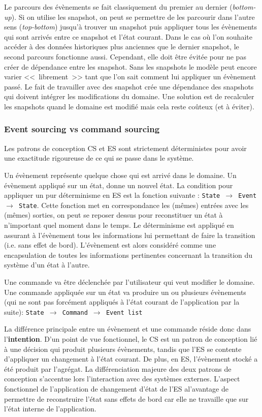 Le parcours des évènements se fait classiquement du premier au dernier 
(\textit{bottom-up}). Si on utilise les \gls{snapshot}, on peut se permettre de les 
parcourir dans l'autre sens (\textit{top-bottom}) jusqu'à trouver un \gls{snapshot} 
puis appliquer tous les évènements qui sont arrivés entre ce \gls{snapshot} et 
l'état courant. Dans le cas où l'on souhaite accéder à des données historiques 
plus anciennes que le dernier \gls{snapshot}, le second parcours fonctionne 
aussi. Cependant, elle doit être évitée pour ne pas créer de dépendance entre 
les \gls{snapshot}. Sans les snapshots le modèle peut encore varier 
<<~librement~>> tant que l'on sait comment lui appliquer un évènement passé. 
Le fait de travailler avec des \gls{snapshot} crée une dépendance des 
snapshots qui doivent intégrer les modifications du domaine. Une solution est 
de recalculer les snapshots quand le domaine est modifié mais cela reste 
coûteux (et à éviter).


\subsubsection{Event sourcing vs command sourcing}
Les patrons de conception \gls{CS} et \gls{ES} sont strictement déterministes pour 
avoir une exactitude rigoureuse de ce qui se passe dans le système.

Un évènement représente quelque chose qui est arrivé dans le domaine. Un 
évènement appliqué sur un état, donne un nouvel état. 
La condition pour appliquer un pur déterminisme en \gls{ES} est la fonction 
suivante : \texttt{State $\rightarrow$ Event $\rightarrow$ State}. Cette fonction met 
en correspondance les (mêmes) entrées avec les (mêmes) sorties, on peut se 
reposer dessus pour reconstituer un état à n'important quel moment dans le 
temps. Le déterminisme est appliqué en assurant à l'évènement tous les 
informations lui permettant de faire la transition (i.e. sans effet de bord). 
L'évènement est alors considéré comme une encapsulation de toutes les 
informations pertinentes concernant la transition du système d'un état à l'autre.

Une commande va être déclenchée par l'utilisateur qui veut modifier le domaine. 
Une commande appliquée sur un état va produire un ou plusieurs évènements (qui 
ne sont pas forcément appliqués à l'état courant de l'application par la suite): 
\texttt{State $\rightarrow$ Command $\rightarrow$ Event list}

La différence principale entre un évènement et une commande réside donc dans 
l'\textbf{intention}. D'un point de vue fonctionnel, le \gls{CS} est un patron de 
conception lié à une décision qui produit plusieurs évènements, tandis que 
l'\gls{ES} se contente d'appliquer un changement à l'état courant. De plus, en 
\gls{ES}, l'évènement stocké a été produit par l'agrégat. 
La différenciation majeure des deux patrons de conception s'accentue lors 
l'interaction avec des systèmes externes. L'aspect fonctionnel de l'application de 
changement d'état de l'\gls{ES} al'avantage de permettre de reconstruire l'état sans 
effets de bord car elle ne travaille que sur l'état interne de l'application. 

